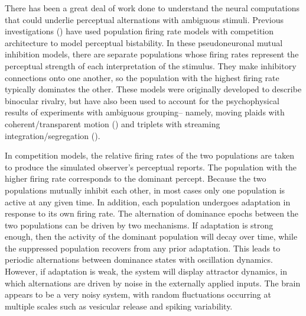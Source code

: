 \documentclass{frontiersSCNS} %
\begin{document}
There has been a great deal of work done to understand the neural computations that could underlie perceptual alternations with ambiguous stimuli. Previous investigations (\cite{Wilson1972, Wilson2003, Laing2002, Shpiro2009, Pastukhov2013}) have used population firing rate models with competition architecture to model perceptual bistability. In these pseudoneuronal mutual inhibition models, there are separate populations whose firing rates represent the perceptual strength of each interpretation of the stimulus. They make inhibitory connections onto one another, so the population with the highest firing rate typically dominates the other. These models were originally developed to describe binocular rivalry, but have also been used to account for the psychophysical results of experiments with ambiguous grouping-- namely, moving plaids with coherent/transparent motion (\cite{Shpiro2009, Laing2002, Pastukhov2013}) and triplets with streaming integration/segregation (\cite{Mill2013}).

In competition models, the relative firing rates of the two populations are taken to produce the simulated observer's perceptual reports. The population with the higher firing rate corresponds to the dominant percept. Because the two populations mutually inhibit each other, in most cases only one population is active at any given time. In addition, each population undergoes adaptation in response to its own firing rate. The alternation of dominance epochs between the two populations can be driven by two mechanisms. If adaptation is strong enough, then the activity of the dominant population will decay over time, while the suppressed population recovers from any prior adaptation. This leads to periodic alternations between dominance states with oscillation dynamics. However, if adaptation is weak, the system will display attractor dynamics, in which alternations are driven by noise in the externally applied inputs. The brain appears to be a very noisy system, with random fluctuations occurring at multiple scales such as vesicular release and spiking variability.
\end{document}
